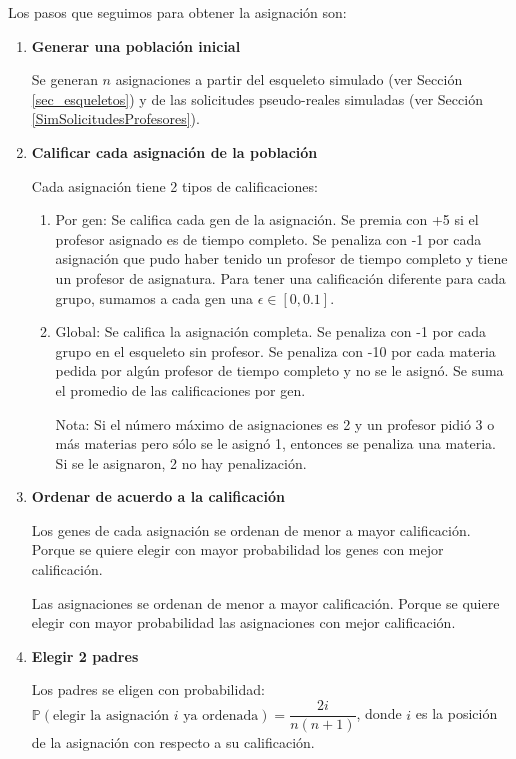 Los pasos que seguimos para obtener la asignación son:

\begin{enumerate}
\item \textbf{Generar una población inicial}

Se generan $n$ asignaciones a partir del esqueleto simulado (ver Sección \ref{sec_esqueletos}) y de las solicitudes pseudo-reales simuladas (ver Sección \ref{SimSolicitudesProfesores}).

\item \textbf{Calificar cada asignación de la población}

Cada asignación tiene 2 tipos de calificaciones:

\begin{enumerate}
\item Por gen: Se califica cada gen de la asignación. Se premia con +5 si el profesor asignado es de tiempo completo. Se penaliza con -1 por cada asignación que pudo haber tenido un profesor de tiempo completo y tiene un profesor de asignatura. Para tener una calificación diferente para cada grupo, sumamos a cada gen una $\epsilon \in [0,0.1]$.

\item Global: Se califica la asignación completa. Se penaliza con -1 por cada grupo en el esqueleto sin profesor. Se penaliza con -10 por cada materia pedida por algún profesor de tiempo completo y no se le asignó. Se suma el promedio de las calificaciones por gen.

Nota:
Si el número máximo de asignaciones es 2 y un profesor pidió 3 o más  materias pero sólo se le asignó 1, entonces se penaliza una materia. Si se le asignaron, 2 no hay penalización.
\end{enumerate}

\item \textbf{Ordenar de acuerdo a la calificación}

Los genes de cada asignación se ordenan de menor a mayor calificación. Porque se quiere elegir con mayor probabilidad los genes con mejor calificación.

Las asignaciones se ordenan de menor a mayor calificación. Porque se quiere elegir con mayor probabilidad las asignaciones con mejor calificación.

\item \textbf{Elegir 2 padres}

Los padres se eligen con probabilidad: $\mathbb{P}(\text{elegir la asignación } i \text{ ya ordenada}) = \dfrac{2i}{n(n+1)}$, donde $i$ es la posición de la asignación con respecto a su calificación.


\end{enumerate}
